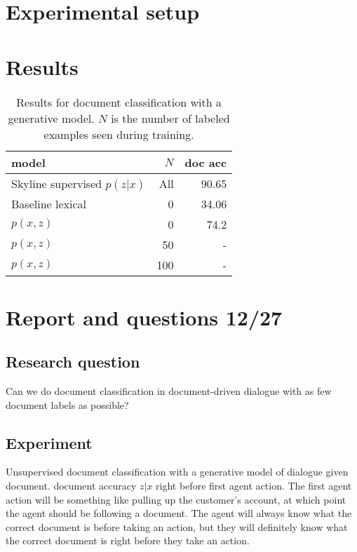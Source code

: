 \documentclass[11pt]{article}
\begin{document}
\section{Experimental setup}

\section{Results}

\begin{table}
\centering
\begin{tabular}{lrr}
\toprule
model & $N$ & doc acc\\
\midrule
Skyline supervised $p(z|x)$ & All & 90.65\\
Baseline lexical & 0 & 34.06\\
$p(x,z)$ & 0 & 74.2\\
$p(x,z)$ & 50 & -\\
$p(x,z)$ & 100 & -\\
\bottomrule
\end{tabular}
\caption{
\label{tbl:unsup-doc}
Results for document classification with a generative model.
$N$ is the number of labeled examples seen during training.}
\end{table}





\appendix

\section{Report and questions 12/27}
\subsection{Research question}
Can we do document classification in document-driven dialogue with as few document labels as possible?

\subsection{Experiment}
Unsupervised document classification with a generative model of dialogue given document.
document accuracy $z|x$ right before first agent action.
The first agent action will be something like pulling up the customer's account,
at which point the agent should be following a document.
The agent will always know what the correct document is before taking an action,
but they will definitely know what the correct document is right before they take an action.
\end{document}
